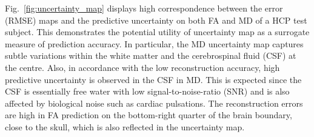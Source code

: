 Fig.~\ref{fig:uncertainty_map} displays high correspondence between the error (RMSE) maps and the predictive uncertainty on both FA and MD of a HCP test subject. This demonstrates the potential utility of uncertainty map as a surrogate measure of prediction accuracy. In particular, the MD uncertainty map captures subtle variations within the white matter and the cerebrospinal fluid (CSF) at the centre. Also, in accordance with the low reconstruction accuracy, high predictive uncertainty is observed in the CSF in MD. This is expected since the CSF is essentially free water with low signal-to-noise-ratio (SNR) and is also affected by biological noise such as cardiac pulsations. The reconstruction errors are high in FA prediction on the bottom-right quarter of the brain boundary, close to the skull, which is also reflected in the uncertainty map. 



